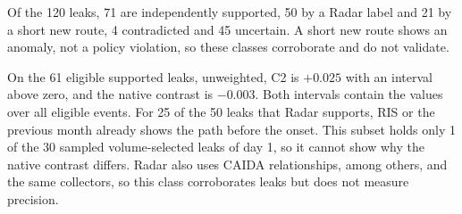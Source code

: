 Of the 120 leaks, 71 are independently supported, 50 by a Radar label and 21 by a short new route, 4 contradicted and 45 uncertain.
A short new route shows an anomaly, not a policy violation, so these classes corroborate and do not validate.

On the 61 eligible supported leaks, unweighted, C2 is $+0.025$ with an interval above zero, and the native contrast is $-0.003$.
Both intervals contain the values over all eligible events.
For 25 of the 50 leaks that Radar supports, RIS or the previous month already shows the path before the onset.
This subset holds only 1 of the 30 sampled volume-selected leaks of day 1, so it cannot show why the native contrast differs.
Radar also uses CAIDA relationships, among others, and the same collectors, so this class corroborates leaks but does not measure precision.

